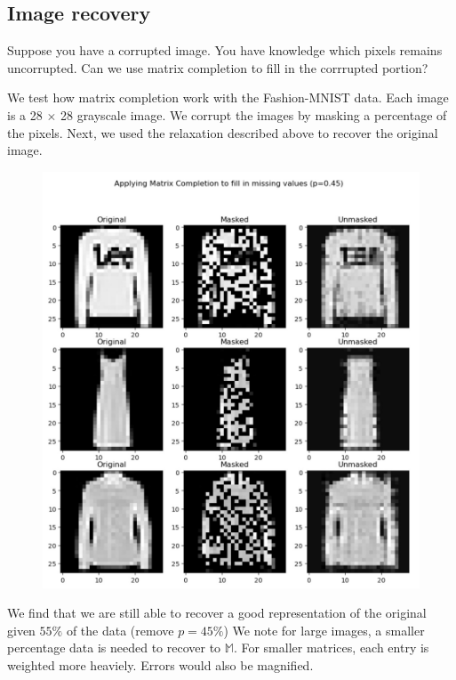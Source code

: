 \documentclass{article}
\begin{document}
\subsection{Image recovery}

Suppose you have a corrupted image. You have knowledge which pixels remains uncorrupted. Can we use matrix completion to
fill in the corrrupted portion? 

We test how matrix completion work with the Fashion-MNIST data. Each image is a 28 $\times$ 28 grayscale image. 
We corrupt the images by masking a percentage of the pixels. Next, we used the relaxation described above to 
recover the original image. 

\newpage 
\begin{figure}[htb]
  \centering
  \includegraphics[scale=.25]{assets/mc-r1.jpg}
\end{figure}

We find that we are still able to recover a good representation of the original given $55\%$ of the data (remove $p = 45\%$)
We note for large images, a smaller percentage data is needed to recover to $\mathbb{M}$.
For smaller matrices, each entry is weighted more heaviely. Errors would also be magnified. 
\end{document}
